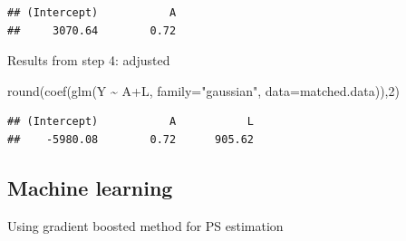 \documentclass[
]{book}
\newenvironment{Shaded}{\begin{snugshade}}{\end{snugshade}}
\newcommand{\AttributeTok}[1]{\textcolor[rgb]{0.77,0.63,0.00}{#1}}
\newcommand{\DecValTok}[1]{\textcolor[rgb]{0.00,0.00,0.81}{#1}}
\newcommand{\FunctionTok}[1]{\textcolor[rgb]{0.00,0.00,0.00}{#1}}
\newcommand{\NormalTok}[1]{#1}
\newcommand{\OtherTok}[1]{\textcolor[rgb]{0.56,0.35,0.01}{#1}}
\newcommand{\SpecialCharTok}[1]{\textcolor[rgb]{0.00,0.00,0.00}{#1}}
\newcommand{\StringTok}[1]{\textcolor[rgb]{0.31,0.60,0.02}{#1}}
\begin{document}
\begin{verbatim}
## (Intercept)           A 
##     3070.64        0.72
\end{verbatim}

Results from step 4: adjusted

\begin{Shaded}
\begin{Highlighting}[]
\FunctionTok{round}\NormalTok{(}\FunctionTok{coef}\NormalTok{(}\FunctionTok{glm}\NormalTok{(Y }\SpecialCharTok{\textasciitilde{}}\NormalTok{ A}\SpecialCharTok{+}\NormalTok{L, }\AttributeTok{family=}\StringTok{"gaussian"}\NormalTok{, }\AttributeTok{data=}\NormalTok{matched.data)),}\DecValTok{2}\NormalTok{)}
\end{Highlighting}
\end{Shaded}

\begin{verbatim}
## (Intercept)           A           L 
##    -5980.08        0.72      905.62
\end{verbatim}

\hypertarget{machine-learning}{%
\subsection{Machine learning}\label{machine-learning}}

Using gradient boosted method for PS estimation

\begin{Shaded}
\end{Shaded}
\end{document}

